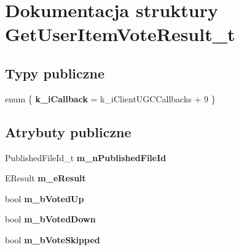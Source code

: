 \hypertarget{struct_get_user_item_vote_result__t}{}\section{Dokumentacja struktury Get\+User\+Item\+Vote\+Result\+\_\+t}
\label{struct_get_user_item_vote_result__t}
\subsection*{Typy publiczne}
\begin{DoxyCompactItemize}
\item 
\mbox{\label{struct_get_user_item_vote_result__t_ae6e8a0a5e7f8d4237b03d19eceb64653}} 
enum \{ {\bfseries k\+\_\+i\+Callback} = k\+\_\+i\+Client\+U\+G\+C\+Callbacks + 9
 \}
\end{DoxyCompactItemize}
\subsection*{Atrybuty publiczne}
\begin{DoxyCompactItemize}
\item 
\mbox{\label{struct_get_user_item_vote_result__t_a9fffbac1a426098ee6743a9ec56b1a9f}} 
Published\+File\+Id\+\_\+t {\bfseries m\+\_\+n\+Published\+File\+Id}
\item 
\mbox{\label{struct_get_user_item_vote_result__t_ad998e743c0881a73e5a292a323fa7970}} 
E\+Result {\bfseries m\+\_\+e\+Result}
\item 
\mbox{\label{struct_get_user_item_vote_result__t_a6860ab4ee69a27b9d55c2a0e97f6a693}} 
bool {\bfseries m\+\_\+b\+Voted\+Up}
\item 
\mbox{\label{struct_get_user_item_vote_result__t_a42b11edd2053356adcae740db291027b}} 
bool {\bfseries m\+\_\+b\+Voted\+Down}
\item 
\mbox{\label{struct_get_user_item_vote_result__t_ab975f128e372ef6cc67e6161b758fed0}} 
bool {\bfseries m\+\_\+b\+Vote\+Skipped}
\end{DoxyCompactItemize}



